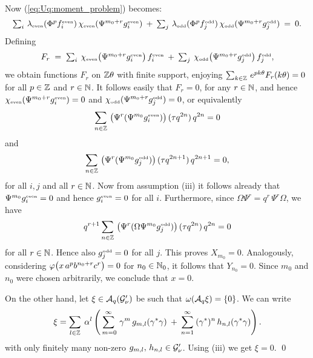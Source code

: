 Now (\ref{eq:Uq:moment_problem}) becomes:
$$  \textstyle
      \sum_i \, \lambda_{\rm \scriptscriptstyle even}(\Phi^p f_i^{\rm \scriptscriptstyle even}) \, \chi_{\rm \scriptscriptstyle even}(\Psi^{m_0+r} g_i^{\rm \scriptscriptstyle even})
 \:+\:\sum_j \, \lambda_{\rm \scriptscriptstyle odd}(\Phi^p f_j^{\rm \scriptscriptstyle odd})   \, \chi_{\rm \scriptscriptstyle odd}(\Psi^{m_0+r} g_j^{\rm \scriptscriptstyle odd})
 \:=\:0.$$
Defining
$$ \textstyle  F_r \;=\;
        \sum_i \:\chieven\!\left(\Psi^{m_0+r} g_i^\scripteven\vertM \right) f_i^\scripteven
  \:+\: \sum_j \:\chiodd \!\left(\Psi^{m_0+r} g_j^\scriptodd\vertM \right)  f_j^\scriptodd, $$
we obtain functions $F_r$ on $\mathbb{Z} \theta$ with finite support, enjoying
$\sum_{k \in \mathbb{Z}} \, e^{pk\theta} F_r(k\theta) = 0$
for all $p\in \mathbb{Z}$ and $r\in\mathbb{N}$.
It follows easily that $F_r=0$, for any $r\in\mathbb{N}$, and hence
$\chi_{\rm \scriptscriptstyle even}(\Psi^{m_0+r} g_i^{\rm \scriptscriptstyle even}) = 0$ and
$\chi_{\rm \scriptscriptstyle odd}(\Psi^{m_0+r} g_j^{\rm \scriptscriptstyle odd}) =0$,
or equivalently
$$ \sum_{n\in\ZZ} \, \left(\Psi^r(\Psi^{m_0} g_i^\scripteven)\vertM \right)
           (\tau q^{2n})\, q^{2n} = 0 $$
and
$$ \sum_{n\in\ZZ} \, \left(\Psi^r(\Psi^{m_0} g_j^\scriptodd)\vertM \right)
           (\tau q^{2n+1})\, q^{2n+1} = 0, $$
for all $i,j$ and all $r\in\mathbb{N}$.
Now from assumption (iii) it follows already that $\Psi^{m_0} g_i^{\rm \scriptscriptstyle even}=0$
and hence $g_i^{\rm \scriptscriptstyle even}=0$ for all $i$.
Furthermore, since $\Omega\Psi^r = q^r\, \Psi^r \Omega$,
we have
$$  q^{r+1} \sum_{n\in\ZZ} \, \left(\Psi^r(\Omega\Psi^{m_0} g_j^\scriptodd)\vertM \right)
              (\tau q^{2n})\, q^{2n} = 0 $$
for all $r\in\mathbb{N}$. Hence also $g_j^{\rm \scriptscriptstyle odd}=0$ for all $j$.
This proves $X_{m_0}=0$.
Analogously, considering $\varphi \!\left(x\,a^p b^{n_0+r}c^r \vertM\right)=0$
for $n_0\in \mathbb{N}_0$, it follows that \mbox{$Y_{n_0}=0$}\@.
Since $m_0$ and $n_0$ were chosen arbitrarily, we conclude that $x=0$.

On the other hand, let $\xi\in {\mathcal A}_q(\mathcal G_\nu')$ be such that $\omega({\mathcal A}_q \xi)=\{0\}$.
We can write
$$ \xi = \sum_{l \in \mathbb{Z}} \: \alpha^l \left(
         \sum_{\:m=0}^\infty \, \gamma^m \, g_{m,l}(\gamma^*\gamma)
   \:+\: \sum_{n=1}^\infty   \: (\gamma^*)^n \,h_{n,l}(\gamma^*\gamma) \right). $$
with only finitely many non-zero $g_{m,l}, \,  h_{n,l} \in \mathcal G_\nu'$.
Using (iii) we get $\xi=0$.
\hfill \qed
